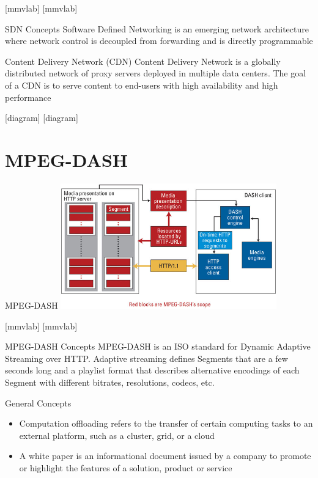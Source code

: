 \documentclass{beamer}
\begin{document}
[mmvlab]
[mmvlab]

\begin{frame}{SDN Concepts}
Software Defined Networking is an emerging network architecture where network control is decoupled from forwarding and is directly programmable
\end{frame}

\begin{frame}{Content Delivery Network (CDN)}
Content Delivery Network is a globally distributed network of proxy servers deployed in multiple data centers. The goal of a CDN is to serve content to end-users with high availability and high performance
\end{frame}

[diagram]
[diagram]

\section{MPEG-DASH}

\begin{frame}{MPEG-DASH}
\centering
\includegraphics[width=0.7\textwidth]{images/dash}
\end{frame}

[mmvlab]
[mmvlab]

\begin{frame}{MPEG-DASH Concepts}
MPEG-DASH is an ISO standard for Dynamic Adaptive Streaming over HTTP. Adaptive streaming defines Segments that are a few seconds long and a playlist format that describes alternative encodings of each Segment with different bitrates, resolutions, codecs, etc.
\end{frame}

\begin{frame}{General Concepts}
\begin{itemize}
\item Computation offloading refers to the transfer of certain computing tasks to an external platform, such as a cluster, grid, or a cloud
\item A white paper is an informational document issued by a company to promote or highlight the features of a solution, product or service
\end{itemize}
\end{frame}
\end{document}
